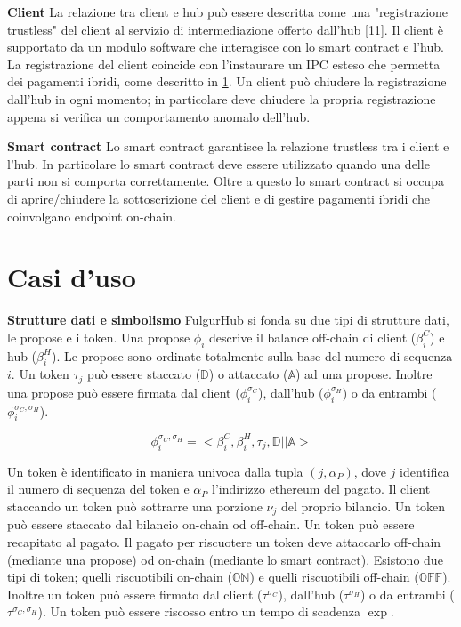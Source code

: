 \documentclass[12pt,italian,]{book}
\begin{document}
\textbf{\textbf{Client}} La relazione tra client e hub può essere descritta come una "registrazione trustless" del client al servizio di intermediazione offerto dall'hub {[}11{]}. Il client è supportato da un modulo software che interagisce con lo smart contract e l'hub. La registrazione del client coincide con l'instaurare un IPC esteso che permetta dei pagamenti ibridi, come descritto in \ref{casi-duso}. Un client può chiudere la registrazione dall'hub in ogni momento; in particolare deve chiudere la propria registrazione appena si verifica un comportamento anomalo dell'hub.

\textbf{\textbf{Smart contract}} Lo smart contract garantisce la relazione trustless tra i client e l'hub. In particolare lo smart contract deve essere utilizzato quando una delle parti non si comporta correttamente. Oltre a questo lo smart contract si occupa di aprire/chiudere la sottoscrizione del client e di gestire pagamenti ibridi che coinvolgano endpoint on-chain.

\hypertarget{casi-duso}{%
\section{Casi d'uso}\label{casi-duso}}

\textbf{\textbf{Strutture dati e simbolismo}} FulgurHub si fonda su due tipi di strutture dati, le propose e i token. Una propose \(\phi_i\) descrive il balance off-chain di client (\(\beta^C_i\)) e hub (\(\beta^H_i\)). Le propose sono ordinate totalmente sulla base del numero di sequenza \(i\). Un token \(\tau_j\) può essere staccato (\(\mathbb{D}\)) o attaccato (\(\mathbb{A}\)) ad una propose. Inoltre una propose può essere firmata dal client (\(\phi^{\sigma_C}_i\)), dall'hub (\(\phi^{\sigma_H}_i\)) o da entrambi (\(\phi^{\sigma_C,\sigma_H}_i\)).

\begin{equation}
\label{Un esempio di propose}
\phi^{\sigma_C, \sigma_H}_i = <\beta^C_i, \beta^H_i, \tau_j ,\mathbb{D}||\mathbb{A}>
\end{equation}

Un token è identificato in maniera univoca dalla tupla \((j, \alpha_P)\), dove \(j\) identifica il numero di sequenza del token e \(\alpha_P\) l'indirizzo ethereum del pagato. Il client staccando un token può sottrarre una porzione \(\nu_j\) del proprio bilancio. Un token può essere staccato dal bilancio on-chain od off-chain. Un token può essere recapitato al pagato. Il pagato per riscuotere un token deve attaccarlo off-chain (mediante una propose) od on-chain (mediante lo smart contract). Esistono due tipi di token; quelli riscuotibili on-chain (\(\mathbb{ON}\)) e quelli riscuotibili off-chain (\(\mathbb{OFF}\)). Inoltre un token può essere firmato dal client (\(\tau^{\sigma_C}\)), dall'hub (\(\tau^{\sigma_H}\)) o da entrambi (\(\tau^{\sigma_C,\sigma_H}\)). Un token può essere riscosso entro un tempo di scadenza \(\exp\).
\end{document}
